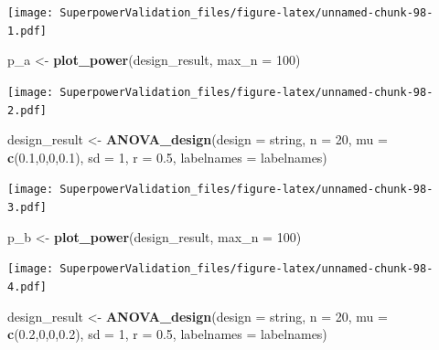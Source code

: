 \documentclass[]{book}
\newenvironment{Shaded}{\begin{snugshade}}{\end{snugshade}}
\newcommand{\DataTypeTok}[1]{\textcolor[rgb]{0.13,0.29,0.53}{#1}}
\newcommand{\DecValTok}[1]{\textcolor[rgb]{0.00,0.00,0.81}{#1}}
\newcommand{\FloatTok}[1]{\textcolor[rgb]{0.00,0.00,0.81}{#1}}
\newcommand{\KeywordTok}[1]{\textcolor[rgb]{0.13,0.29,0.53}{\textbf{#1}}}
\newcommand{\NormalTok}[1]{#1}
\newcommand{\StringTok}[1]{\textcolor[rgb]{0.31,0.60,0.02}{#1}}
\begin{document}
\texttt{[image: SuperpowerValidation\_files/figure-latex/unnamed-chunk-98-1.pdf]}

\begin{Shaded}
\begin{Highlighting}[]
\NormalTok{p_a <-}\StringTok{ }\KeywordTok{plot_power}\NormalTok{(design_result,}
                      \DataTypeTok{max_n =} \DecValTok{100}\NormalTok{)}
\end{Highlighting}
\end{Shaded}

\texttt{[image: SuperpowerValidation\_files/figure-latex/unnamed-chunk-98-2.pdf]}

\begin{Shaded}
\begin{Highlighting}[]
\NormalTok{design_result <-}\StringTok{ }\KeywordTok{ANOVA_design}\NormalTok{(}\DataTypeTok{design =}\NormalTok{ string,}
                              \DataTypeTok{n =} \DecValTok{20}\NormalTok{, }
                              \DataTypeTok{mu =} \KeywordTok{c}\NormalTok{(}\FloatTok{0.1}\NormalTok{,}\DecValTok{0}\NormalTok{,}\DecValTok{0}\NormalTok{,}\FloatTok{0.1}\NormalTok{), }
                              \DataTypeTok{sd =} \DecValTok{1}\NormalTok{, }
                              \DataTypeTok{r =} \FloatTok{0.5}\NormalTok{, }
                              \DataTypeTok{labelnames =}\NormalTok{ labelnames)}
\end{Highlighting}
\end{Shaded}

\texttt{[image: SuperpowerValidation\_files/figure-latex/unnamed-chunk-98-3.pdf]}

\begin{Shaded}
\begin{Highlighting}[]
\NormalTok{p_b <-}\StringTok{ }\KeywordTok{plot_power}\NormalTok{(design_result,}
                      \DataTypeTok{max_n =} \DecValTok{100}\NormalTok{)}
\end{Highlighting}
\end{Shaded}

\texttt{[image: SuperpowerValidation\_files/figure-latex/unnamed-chunk-98-4.pdf]}

\begin{Shaded}
\begin{Highlighting}[]
\NormalTok{design_result <-}\StringTok{ }\KeywordTok{ANOVA_design}\NormalTok{(}\DataTypeTok{design =}\NormalTok{ string,}
                              \DataTypeTok{n =} \DecValTok{20}\NormalTok{, }
                              \DataTypeTok{mu =} \KeywordTok{c}\NormalTok{(}\FloatTok{0.2}\NormalTok{,}\DecValTok{0}\NormalTok{,}\DecValTok{0}\NormalTok{,}\FloatTok{0.2}\NormalTok{), }
                              \DataTypeTok{sd =} \DecValTok{1}\NormalTok{, }
                              \DataTypeTok{r =} \FloatTok{0.5}\NormalTok{, }
                              \DataTypeTok{labelnames =}\NormalTok{ labelnames)}
\end{Highlighting}
\end{Shaded}
\end{document}
